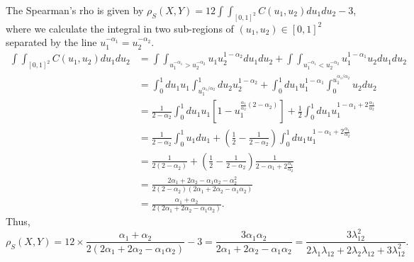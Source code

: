 \documentclass[paper=a4, fontsize=11pt]{scrartcl} %
\numberwithin{equation}{section} %
\numberwithin{figure}{section} %
\numberwithin{table}{section} %
\begin{document}
The Spearman's rho is given by
$
\rho_S(X,Y) = 12\int\int_{[0,1]^2} C(u_1,u_2)du_1 du_2 - 3
$, where we calculate the integral in two sub-regions of $(u_1,u_2)\in [0,1]^2$ separated by the line $u_1^{-\alpha_1} = u_2^{-\alpha_2}$.
\begin{align*}
\int\int_{[0,1]^2} C(u_1,u_2)du_1 du_2 &= \int\int_{u_1^{-\alpha_1} > u_2^{-\alpha_2}} u_1 u_2^{1-\alpha_2 }du_1 du_2
+ \int\int_{u_1^{-\alpha_1} < u_2^{-\alpha_2}} u_1^{1-\alpha_1} u_2 du_1 du_2 \\
 &= \int_0^1 du_1 u_1\int_{u_1^{\alpha_1/\alpha_2}}^1 du_2  u_2^{1-\alpha_2 }
+ \int_0^1 du_1 u_1^{1-\alpha_1}\int_0^{u_1^{\alpha_1/\alpha_2}}  u_2 du_2\\
&= \frac{1}{2-\alpha_2} \int_0^1 du_1 u_1 \left[ 1- u_1^{\frac{\alpha_1}{\alpha_2} (2-\alpha_2)} \right]
+ \frac{1}{2}\int_0^1 du_1 u_1^{1-\alpha_1 + 2\frac{\alpha_1}{\alpha_2}}\\
&= \frac{1}{2-\alpha_2}\int_0^1 u_1 du_1  + \left(\frac{1}{2} - \frac{1}{2-\alpha_2}\right)\int_0^1 du_1 u_1^{1-\alpha_1 + 2\frac{\alpha_1}{\alpha_2}}\\
&= \frac{1}{2(2-\alpha_2)} + \left(\frac{1}{2} - \frac{1}{2-\alpha_2}\right)\frac{1}{2-\alpha_1 + 2\frac{\alpha_1}{\alpha_2}}\\
&= \frac{2\alpha_1+2\alpha_2-\alpha_1\alpha_2 -\alpha_2^2}{2(2-\alpha_2)(2\alpha_1 + 2\alpha_2 -\alpha_1\alpha_2)}\\
&= \frac{\alpha_1  + \alpha_2}{2(2\alpha_1 + 2\alpha_2 -\alpha_1\alpha_2)}.
\end{align*}
Thus,
$$
\rho_S(X,Y) = 12 \times \frac{\alpha_1  + \alpha_2}{2(2\alpha_1 + 2\alpha_2 -\alpha_1\alpha_2)} -3 = 
\frac{3\alpha_1 \alpha_2}{2\alpha_1 + 2\alpha_2 -\alpha_1\alpha_2} = \frac{3\lambda_{12}^2}{2\lambda_1\lambda_{12} + 2\lambda_2\lambda_{12} + 3\lambda_{12}^2}.
$$
\newpage
\end{document}
